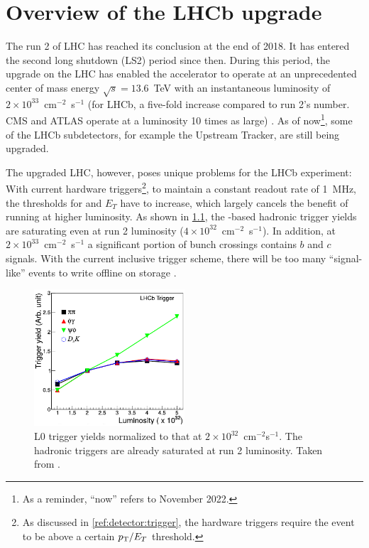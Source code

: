 \chapter{Overview of the LHCb upgrade}
\label{ref:lhcb-upgrade-overview}

The run 2 of LHC has reached its conclusion at the end of 2018.
It has entered the second long shutdown (LS2) period since then.
During this period,
the upgrade on the LHC has enabled the accelerator to operate at
an unprecedented center of mass energy $\sqrt{s} = 13.6$~TeV with an
instantaneous luminosity of $2 \times 10^{33}$~cm$^{-2}$~s$^{-1}$
(for LHCb, a five-fold increase compared to run 2's number.
CMS and ATLAS operate at a luminosity 10 times as large)
\cite{CERN_news:2022,Piucci_2017}.
As of now\footnote{
    As a reminder, ``now'' refers to November 2022.
}, some of the LHCb subdetectors, for example the Upstream Tracker, are still
being upgraded.

The upgraded LHC, however, poses unique problems for the LHCb experiment:
With current hardware triggers\footnote{
    As discussed in \cref{ref:detector:trigger},
    the hardware triggers require the event to be above a certain $p_{\mathrm{T}} / E_T$
    threshold.
},
to maintain a constant readout rate of 1~MHz,
the thresholds for \pt and $E_T$ have to increase,
which largely cancels the benefit of running at higher luminosity.
As shown in \cref{fig:l0-trigger-eff},
the \pt-based hadronic trigger yields are saturating even at run 2 luminosity
($4 \times 10^{32}$~cm$^{-2}$~s$^{-1}$).
In addition, at $2 \times 10^{33}$~cm$^{-2}$~s$^{-1}$ a significant portion of
bunch crossings contains $b$ and $c$ signals.
With the current inclusive trigger scheme,
there will be too many ``signal-like'' events to write offline on storage
\cite{Albrecht_2014}.

\begin{figure}[!htb]
    \centering
    \includegraphics[width=0.5\textwidth]{./figs-lhcb-upgrade-overview/trigger_efficiency.pdf}
    \caption{
        L0 trigger yields normalized to that at
        $2 \times 10^{32}$~cm$^{-2}$s$^{-1}$.
        The hadronic triggers are already saturated at run 2 luminosity.
        Taken from \cite{CERN-LHCC-2011-001}.
    }
    \label{fig:l0-trigger-eff}
\end{figure}

